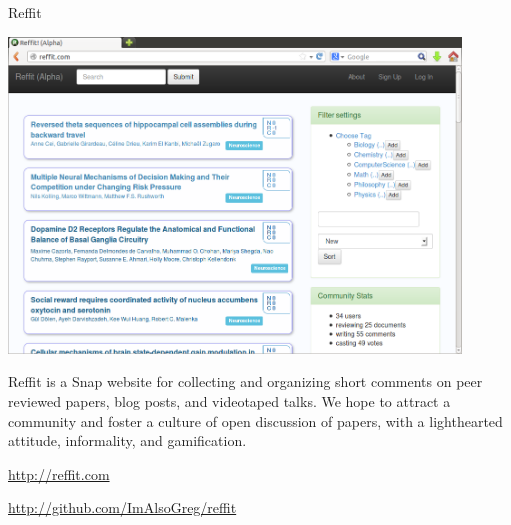 \begin{hcarentry}[new]{Reffit}
\makeheader

\begin{center}
\includegraphics[width=0.9\textwidth]{./reffit.png}
\end{center}

Reffit is a Snap website for collecting and organizing short comments on peer reviewed papers, blog posts, and videotaped talks. We hope to attract a community and foster a culture of open discussion of papers, with a lighthearted attitude, informality, and gamification.

\FurtherReading
\begin{compactitem}
\item \url{http://reffit.com}
\item \url{http://github.com/ImAlsoGreg/reffit}
\end{compactitem}
\end{hcarentry}
